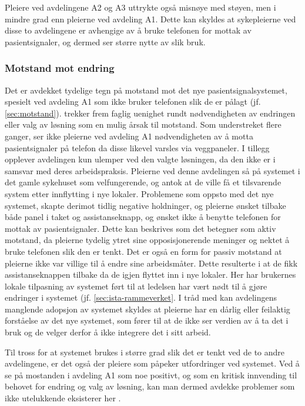 \noindent
Pleiere ved avdelingene A2 og A3 uttrykte også misnøye med støyen, men i mindre grad enn pleierne ved avdeling A1. Dette kan skyldes at sykepleierne ved disse to avdelingene er avhengige av å bruke telefonen for mottak av pasientsignaler, og dermed ser større nytte av slik bruk. 

\subsubsection{Motstand mot endring}
Det er avdekket tydelige tegn på motstand mot det nye pasientsignalsystemet, spesielt ved avdeling A1 som ikke bruker telefonen slik de er pålagt (jf. \ref{sec:motstand}). \citet{Jacobsen12} trekker frem faglig uenighet rundt nødvendigheten av endringen eller valg av løsning som en mulig årsak til motstand. Som understreket flere ganger, ser ikke pleierne ved avdeling A1 nødvendigheten av å motta pasientsignaler på telefon da disse likevel varsles via veggpaneler. I tillegg opplever avdelingen kun ulemper ved den valgte løsningen, da den ikke er i samsvar med deres arbeidspraksis. Pleierne ved denne avdelingen så på systemet i det gamle sykehuset som velfungerende, og antok at de ville få et tilsvarende system etter innflytting i nye lokaler. Problemene som oppsto med det nye systemet, skapte derimot tidlig negative holdninger, og pleierne ønsket tilbake både panel i taket og assistanseknapp, og ønsket ikke å benytte telefonen for mottak av pasientsignaler. Dette kan beskrives som det \citet{Lapointe05} betegner som aktiv motstand, da pleierne tydelig ytret sine opposisjonerende meninger og nektet å bruke telefonen slik den er tenkt. Det er også en form for passiv motstand at pleierne ikke var villige til å endre sine arbeidsmåter. Dette resulterte i at de fikk assistanseknappen tilbake da de igjen flyttet inn i nye lokaler. Her har brukernes lokale tilpasning av systemet ført til at ledelsen har vært nødt til å gjøre endringer i systemet (jf. \ref{sec:ista-rammeverket}. I tråd med \citet{Orlikowski92} kan avdelingens manglende adopsjon av systemet skyldes at pleierne har en dårlig eller feilaktig forståelse av det nye systemet, som fører til at de ikke ser verdien av å ta det i bruk og de velger derfor å ikke integrere det i sitt arbeid. 

\noindent
Til tross for at systemet brukes i større grad slik det er tenkt ved de to andre avdelingene, er det også der pleiere som påpeker utfordringer ved systemet. Ved å se på mostanden i avdeling A1 som noe positivt, og som en kritisk innvending til behovet for endring og valg av løsning, kan man dermed avdekke problemer som ikke utelukkende eksisterer her \citep{Jacobsen}.

